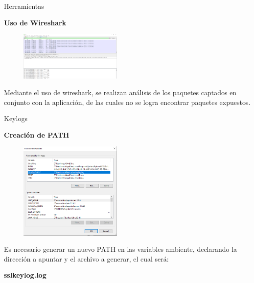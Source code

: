 \begin{frame}[t,fragile]{Herramientas}

\textbf{Uso de Wireshark}

\begin{figure} 
\vspace{2pt}
  \begin{center}
    \includegraphics[width=0.45\textwidth]{wireshark.png}
    \label{fig:databaseUserTable}
  \end{center}
  \vspace{2pt}
\end{figure} 

\bigskip

Mediante el uso de wireshark, se realizan análisis de los paquetes captados en conjunto con la aplicación, de las cuales no se logra encontrar paquetes expuestos. 

\end{frame}


\begin{frame}[t,fragile]{Keylogs}

\textbf{Creación de PATH}

\begin{figure} 
\vspace{2pt}
  \begin{center}
    \includegraphics[width=0.45\textwidth]{sslpath.png}
    \label{fig:databaseUserTable}
  \end{center}
  \vspace{2pt}
\end{figure} 

\bigskip

Es necesario generar un nuevo PATH en las variables ambiente, declarando la dirección a apuntar y el archivo a generar, el cual será:

\begin{center}
   \textbf{sslkeylog.log}
\end{center}


\end{frame}



